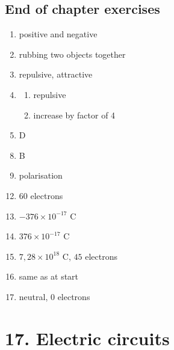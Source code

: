 \subsection{End of chapter exercises}
\begin{multicols}{3}
 \begin{enumerate}[noitemsep, label=\textbf{(\arabic*)} ]
\item positive and negative
\item rubbing two objects together
\item repulsive, attractive
\item 
 \begin{enumerate}[noitemsep, label=\textbf{(\alph*)} ]
\item repulsive
\item increase by factor of 4
 \end{enumerate}
\item D
 \end{enumerate}
\begin{enumerate}[noitemsep, label=\textbf{(\arabic*)} ]
\setcounter{enumi}{7}
 \item B
\item polarisation
\end{enumerate}
\begin{enumerate}[noitemsep, label=\textbf{(\arabic*)} ]
\setcounter{enumi}{11}
 \item $60$ electrons
\item $-376 \times 10^{−17} \text{ C}$
\item $376 \times 10^{−17} \text{ C}$
\item $7,28 \times 10^{18} \text{ C}$, $45$ electrons
\item same as at start
\item neutral, $0$ electrons
\end{enumerate}
\end{multicols}

\section{17. Electric circuits}

